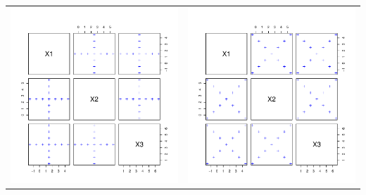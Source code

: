 {      \newpage
      \begin{center}
        \begin{tabular}{cc}
          \includegraphics[width=8cm]{Figures/Axial_DOE.pdf} & \includegraphics[width=8cm]{Figures/Factorial_DOE.pdf}\\

\end{tabular}
\end{center}}
